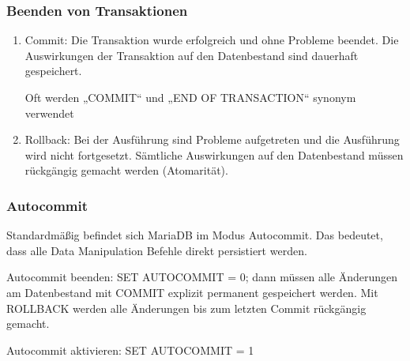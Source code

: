 \documentclass[asp1.tex]{subfiles}
\begin{document}
\subsubsection{Beenden von Transaktionen}

\begin{enumerate}
    \item Commit: Die Transaktion wurde erfolgreich und ohne Probleme beendet. Die Auswirkungen der Transaktion auf den Datenbestand sind dauerhaft gespeichert.

          Oft werden „COMMIT“ und „END OF TRANSACTION“ synonym verwendet
    \item Rollback: Bei der Ausführung sind Probleme aufgetreten und die Ausführung wird nicht fortgesetzt. Sämtliche Auswirkungen auf den Datenbestand müssen rückgängig gemacht werden (Atomarität).
\end{enumerate}

\subsubsection{Autocommit}

Standardmäßig befindet sich MariaDB im Modus Autocommit. Das bedeutet, dass alle Data Manipulation Befehle direkt persistiert werden.

Autocommit beenden: SET AUTOCOMMIT = 0; dann müssen alle Änderungen am Datenbestand mit COMMIT explizit permanent gespeichert werden.
Mit ROLLBACK werden alle Änderungen bis zum letzten Commit rückgängig gemacht.

Autocommit aktivieren: SET AUTOCOMMIT = 1
\end{document}
